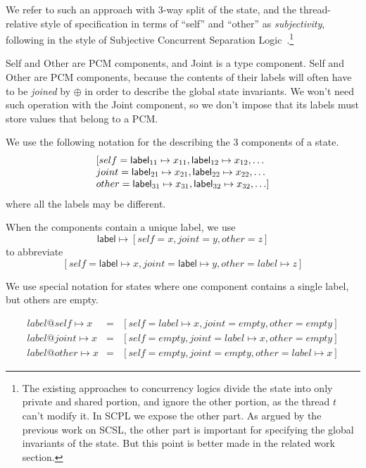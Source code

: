 We refer to such an approach with 3-way split of the state, and the
thread-relative style of specification in terms of ``self'' and
``other'' as \emph{subjectivity}, following in the style of Subjective
Concurrent Separation
Logic~\cite{LeyWild-Nanevski:POPL13}.\footnote{The existing approaches
  to concurrency logics divide the state into only private and shared
  portion, and ignore the other portion, as the thread $t$ can't
  modify it. In SCPL we expose the other part. As argued by the
  previous work on SCSL, the other part is important for specifying
  the global invariants of the state. But this point is better made in
  the related work section.}

Self and Other are PCM components, and Joint is a type component.
Self and Other are PCM components, because the contents of their
labels will often have to be \emph{joined} by $\oplus$ in order to
describe the global state invariants. We won't need such operation
with the Joint component, so we don't impose that its labels must
store values that belong to a PCM.

We use the following notation for the describing the 3 components of a
state.
\[
\begin{array}[t]{l}
[self = \mathsf{label}_{11} \mapsto x_{11}, \mathsf{label}_{12} \mapsto x_{12}, \ldots\\ 
 joint = \mathsf{label}_{21} \mapsto x_{21}, \mathsf{label}_{22} \mapsto x_{22}, \ldots\\
 other = \mathsf{label}_{31} \mapsto x_{31}, \mathsf{label}_{32} \mapsto x_{32}, \ldots]
\end{array}
\]
where all the labels may be different. 

When the components contain a unique label, we use
\[
\mathsf{label} \mapsto [self = x, joint = y, other = z]
\]
to abbreviate
\[
[self = \mathsf{label} \mapsto x, joint = \mathsf{label} \mapsto y, other = {label} \mapsto z]
\]

We use special notation for states where one component contains a
single label, but others are empty.

\[
\begin{array}{rcl}
label@self \mapsto x & = & [self = label \mapsto x, joint=empty, other=empty]\\
label@joint \mapsto x & = & [self = empty, joint=label \mapsto x, other=empty]\\
label@other \mapsto x & = & [self = empty, joint=empty, other=label \mapsto x]
\end{array}
\]


